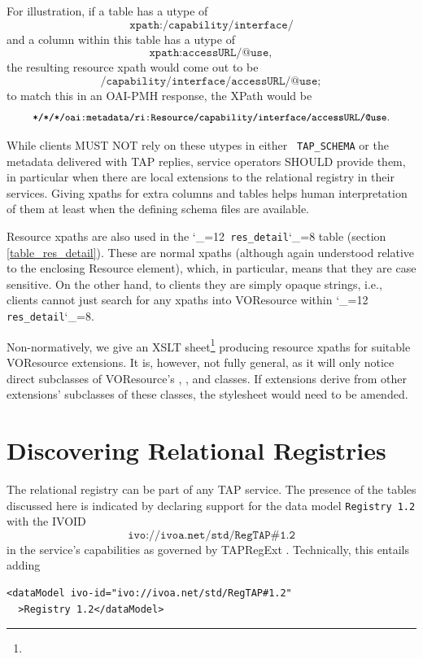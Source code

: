\documentclass[11pt,a4paper]{ivoa}
\makeatletter
\def\rtent#1{\texttt{\color{rtcolor}\verb|#1|}}
\def\makeunderscoreletter{\catcode`\_=12}
\def\makeunderscoresubscript{\catcode`\_=8}
\def\rtent{\makeunderscoreletter\relax\rt@nt}
\def\rt@nt#1{\texttt{\color{rtcolor} #1}\makeunderscoresubscript{}}
\newcommand{\tapent}[1]{\texttt{\color{tapcolor} #1}}
\makeatother
\begin{document}
For illustration, if a table has a utype of
$$\texttt{xpath:/capability/interface/}$$ and a column within this table
has a utype of $$\texttt{xpath:accessURL/@use},$$ the resulting resource
xpath would come out to be
$$\texttt{/capability/interface/accessURL/@use};$$ to match this in an
OAI-PMH response, the XPath would be
$$\texttt{\small
*/*/*/oai:metadata/ri:Resource/capability/interface/accessURL/@use}.$$


While clients MUST NOT rely on these utypes in either
\tapent{TAP\_SCHEMA} or the
metadata delivered with TAP replies, service operators SHOULD provide them, in
particular when there are local extensions to the relational registry in their
services.  Giving xpaths for extra columns and tables helps human
interpretation of them at least when the defining schema files are
available.

Resource xpaths are also used in the \rtent{res_detail} table (section
\ref{table_res_detail}).  These are normal xpaths
(although again understood relative to the enclosing Resource element),
which, in particular, means that they are case sensitive.  On the other
hand, to clients they are simply opaque strings, i.e., clients cannot
just search for any xpaths into VOResource within \rtent{res_detail}.

Non-normatively, we give an XSLT
sheet\footnote{} producing resource xpaths
for suitable VOResource extensions. It is, however, not fully general,
as it will only notice direct subclasses of VOResource's
, , and  classes.
If extensions derive from other extensions' subclasses of these classes,
the stylesheet would need to be amended.

\section{Discovering Relational Registries}

\label{registration}

The relational registry can be part of any TAP service.  The presence
of the tables discussed here is indicated by declaring support for the
data model \texttt{Registry 1.2} with the IVOID
$$\texttt{ivo://ivoa.net/std/RegTAP\#1.2}$$ in the service's
capabilities as governed by TAPRegExt \citep{2012ivoa.spec.0827D}.  Technically, this
entails adding


\begin{verbatim}
<dataModel ivo-id="ivo://ivoa.net/std/RegTAP#1.2"
  >Registry 1.2</dataModel>
\end{verbatim}
\end{document}
